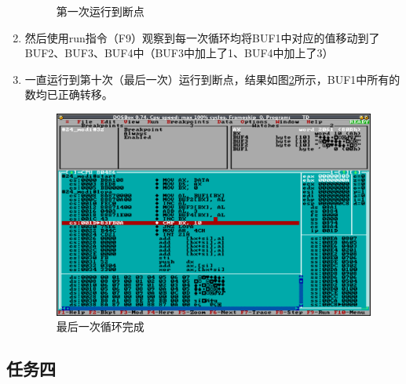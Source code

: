 \documentclass{article}
\begin{document}
\begin{enumerate}
\begin{figure}[H]
				\caption{第一次运行到断点}
				\label{fig:firstbreakpoint}
			\end{figure}
		\item 然后使用run指令（F9）观察到每一次循环均将BUF1中对应的值移动到了BUF2、BUF3、BUF4中（BUF3中加上了1、BUF4中加上了3）
		\item 一直运行到第十次（最后一次）运行到断点，结果如图\ref{fig:loopcomplete}所示，BUF1中所有的数均已正确转移。
			\begin{figure}[H]
				\centering
				\includegraphics[width=0.8\linewidth]{res/homework_1/fig13.png}
				\caption{最后一次循环完成}
				\label{fig:loopcomplete}
			\end{figure}
	\end{enumerate}

	\subsection{任务四}
\end{document}
